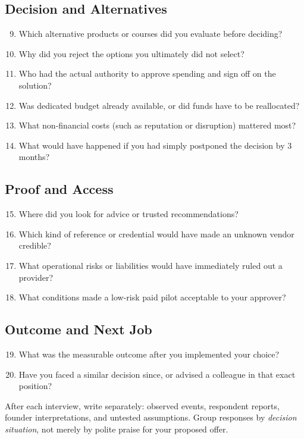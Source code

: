 \subsection*{Decision and Alternatives}
\begin{enumerate}
    \setcounter{enumi}{8}
    \item Which alternative products or courses did you evaluate before deciding?
    \item Why did you reject the options you ultimately did not select?
    \item Who had the actual authority to approve spending and sign off on the solution?
    \item Was dedicated budget already available, or did funds have to be reallocated?
    \item What non-financial costs (such as reputation or disruption) mattered most?
    \item What would have happened if you had simply postponed the decision by 3 months?
\end{enumerate}

\subsection*{Proof and Access}
\begin{enumerate}
    \setcounter{enumi}{14}
    \item Where did you look for advice or trusted recommendations?
    \item Which kind of reference or credential would have made an unknown vendor credible?
    \item What operational risks or liabilities would have immediately ruled out a provider?
    \item What conditions made a low-risk paid pilot acceptable to your approver?
\end{enumerate}

\subsection*{Outcome and Next Job}
\begin{enumerate}
    \setcounter{enumi}{18}
    \item What was the measurable outcome after you implemented your choice?
    \item Have you faced a similar decision since, or advised a colleague in that exact position?
\end{enumerate}

After each interview, write separately: observed events, respondent reports, founder interpretations, and untested assumptions. Group responses by \emph{decision situation}, not merely by polite praise for your proposed offer.

